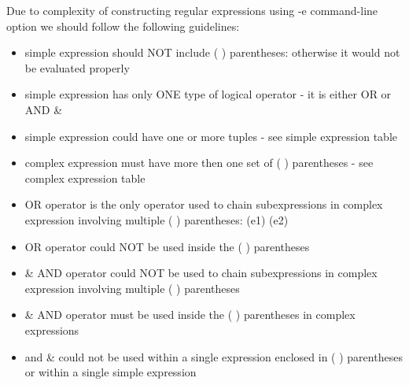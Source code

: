 \documentclass[11pt]{article} %
\begin{document}
Due to complexity of constructing regular expressions using -e command-line option  we should follow the following guidelines:

\begin{itemize}

\item{simple expression should NOT include ( ) parentheses: otherwise it would not be evaluated properly}

\item{simple expression has only ONE type of logical operator - it is either OR \textbar \space or AND \&}

\item{simple expression could have one or more tuples - see simple expression table}

\item{complex expression must have more then one set of ( ) parentheses - see complex expression table}

\item{\textbar \space OR operator is the only operator used to chain subexpressions in complex expression involving multiple ( ) parentheses: (e1) \textbar \space (e2) }

\item{\textbar \space OR operator could NOT be used inside the ( ) parentheses}

\item{\& AND operator could NOT be used to chain subexpressions in complex expression involving  multiple ( ) parentheses}

\item{\& AND operator must be used inside the ( ) parentheses in complex expressions}

\item{\textbar \space  and \& could not be used within a single expression enclosed in ( ) parentheses or within a single simple expression}

\end{itemize}
\end{document}
